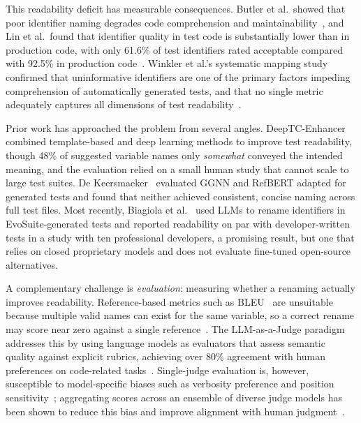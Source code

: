 \documentclass[conference]{IEEEtran}
\begin{document}
This readability deficit has measurable consequences.
Butler et al.\ showed that poor identifier naming degrades code comprehension
and maintainability~\cite{butler2010exploring}, and Lin et al.\ found that
identifier quality in test code is substantially lower than in production code,
with only 61.6\% of test identifiers rated acceptable compared with 92.5\% in
production code~\cite{lin2019quality}.
Winkler et al.'s systematic mapping study confirmed that uninformative
identifiers are one of the primary factors impeding comprehension of
automatically generated tests, and that no single metric adequately captures
all dimensions of test readability~\cite{winkler2024investigating}.

Prior work has approached the problem from several angles.
DeepTC-Enhancer~\cite{roy2020deeptcenhancer} combined template-based and deep
learning methods to improve test readability, though 48\% of suggested variable
names only \emph{somewhat} conveyed the intended meaning, and the evaluation
relied on a small human study that cannot scale to large test suites.
De Keersmaeker~\cite{dekeersmaeker2024enhancing} evaluated GGNN and RefBERT
adapted for generated tests and found that neither achieved consistent, concise
naming across full test files.
Most recently, Biagiola et al.~\cite{biagiola2025improving} used LLMs to
rename identifiers in EvoSuite-generated tests and reported readability on par
with developer-written tests in a study with ten professional developers, a
promising result, but one that relies on closed proprietary models and does not
evaluate fine-tuned open-source alternatives.

A complementary challenge is \emph{evaluation}: measuring whether a renaming
actually improves readability.
Reference-based metrics such as BLEU~\cite{papineni2002bleu} are unsuitable
because multiple valid names can exist for the same variable, so a correct
rename may score near zero against a single
reference~\cite{evtikhiev2023bleu,mastropaolo2023renaming}.
The LLM-as-a-Judge paradigm addresses this by using language models as
evaluators that assess semantic quality against explicit rubrics, achieving over
80\% agreement with human preferences on code-related
tasks~\cite{zheng2023judging,zhuo2024ice}.
Single-judge evaluation is, however, susceptible to model-specific biases such
as verbosity preference and position sensitivity~\cite{zheng2023judging};
aggregating scores across an ensemble of diverse judge models has been shown to
reduce this bias and improve alignment with human
judgment~\cite{verga2024poll,chan2024chateval}.
\end{document}
